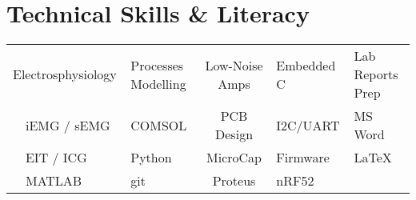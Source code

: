 \documentclass[a4paper,11pt]{article}
\makeatletter
\newcommand{\resumeProjectHeading}[2]{
    \item
    \begin{tabular*}{0.97\textwidth}{l@{\extracolsep{\fill}}r}
      \small#1 & #2 \\
    \end{tabular*}\vspace{-7pt}
}
\newcommand{\resumeSubHeadingListStart}{\begin{itemize}[leftmargin=0.15in, label={}]}
\newcommand{\resumeSubHeadingListEnd}{\end{itemize}}
\makeatother
\begin{document}
\section{Technical Skills \& Literacy}
%
%
\begin{tabularx}{1.0\textwidth} { 
   X L c R R}
$\> \> \>$    Electrosphysiology 		& Processes Modelling	& Low-Noise Amps 		& Embedded C\	& Lab Reports Prep		\\
$\> \> \>$	iEMG / sEMG 			& COMSOL			& PCB Design	 	& I2C/UART		& MS Word		 	\\
$\> \> \>$	EIT / ICG                		& Python 			& MicroCap        		& Firmware 		& \LaTeX			\\
$\> \> \>$	MATLAB			& git 				& Proteus            		& nRF52		&  			\\

\end{tabularx}

\end{document}
